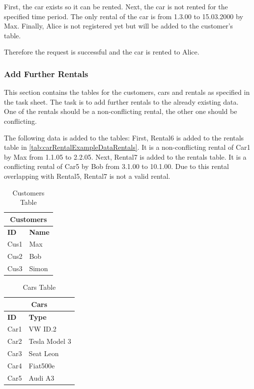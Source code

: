 First, the car exists so it can be rented.
Next, the car is not rented for the specified time period.
The only rental of the car is from 1.3.00 to 15.03.2000 by Max.
Finally, Alice is not registered yet but will be added to the customer's table.

Therefore the request is successful and the car is rented to Alice.

\subsubsection*{Add Further Rentals}
This section contains the tables for the customers, cars and rentals as specified in the task sheet.
The task is to add further rentals to the already existing data.
One of the rentals should be a non-conflicting rental, the other one should be conflicting.

The following data is added to the tables:
First, Rental6 is added to the rentals table in \autoref{tab:carRentalExampleDataRentals}.
It is a non-conflicting rental of Car1 by Max from 1.1.05 to 2.2.05.
Next, Rental7 is added to the rentals table.
It is a conflicting rental of Car5 by Bob from 3.1.00 to 10.1.00.
Due to this rental overlapping with Rental5, Rental7 is not a valid rental.

\begin{table}[H]
    \centering
    \caption{Customers Table}
    \label{tab:carRentalExampleDataCustomers}
    \begin{tabular}{|p{2cm}|p{2cm}|}
        \hline
        \multicolumn{2}{|c|}{\textbf{Customers}} \\
        \hline
        \textbf{ID} & \textbf{Name} \\
        \hline
        Cus1 & Max \\
        Cus2 & Bob \\
        Cus3 & Simon \\
        \hline
    \end{tabular}
\end{table}

\begin{table}[H]
    \centering
    \caption{Cars Table}
    \label{tab:carRentalExampleDataCars}
    \begin{tabular}{|p{2cm}|p{3cm}|}
        \hline
        \multicolumn{2}{|c|}{\textbf{Cars}} \\
        \hline
        \textbf{ID} & \textbf{Type} \\
        \hline
        Car1 & VW ID.2 \\
        Car2 & Tesla Model 3 \\
        Car3 & Seat Leon \\
        Car4 & Fiat500e \\
        Car5 & Audi A3 \\
        \hline
    \end{tabular}
\end{table}

